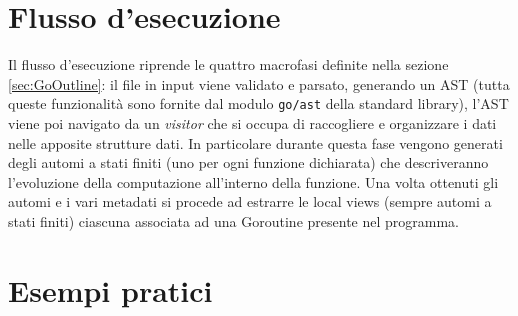 \section{Flusso d'esecuzione}
Il flusso d'esecuzione riprende le quattro macrofasi definite nella sezione \ref{sec:GoOutline}: il file in input viene validato e parsato, generando un AST (tutta queste funzionalità sono fornite dal modulo \texttt{go/ast} della standard library), l'AST viene poi navigato da un \emph{visitor} che si occupa di raccogliere e organizzare i dati nelle apposite strutture dati. In particolare durante questa fase vengono generati degli automi a stati finiti (uno per ogni funzione dichiarata) che descriveranno l'evoluzione della computazione all'interno della funzione. Una volta ottenuti gli automi e i vari metadati si procede ad estrarre le local views (sempre automi a stati finiti) ciascuna associata ad una Goroutine presente nel programma.

\section{Esempi pratici}